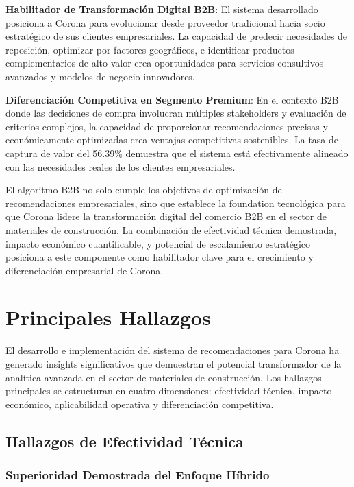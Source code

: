 \documentclass[twocolumn]{article}
\begin{document}
\textbf{Habilitador de Transformación Digital B2B}: El sistema desarrollado posiciona a Corona para evolucionar desde proveedor tradicional hacia socio estratégico de sus clientes empresariales. La capacidad de predecir necesidades de reposición, optimizar por factores geográficos, e identificar productos complementarios de alto valor crea oportunidades para servicios consultivos avanzados y modelos de negocio innovadores.

\textbf{Diferenciación Competitiva en Segmento Premium}: En el contexto B2B donde las decisiones de compra involucran múltiples stakeholders y evaluación de criterios complejos, la capacidad de proporcionar recomendaciones precisas y económicamente optimizadas crea ventajas competitivas sostenibles. La tasa de captura de valor del 56.39\% demuestra que el sistema está efectivamente alineado con las necesidades reales de los clientes empresariales.

El algoritmo B2B no solo cumple los objetivos de optimización de recomendaciones empresariales, sino que establece la foundation tecnológica para que Corona lidere la transformación digital del comercio B2B en el sector de materiales de construcción. La combinación de efectividad técnica demostrada, impacto económico cuantificable, y potencial de escalamiento estratégico posiciona a este componente como habilitador clave para el crecimiento y diferenciación empresarial de Corona.

\section{Principales Hallazgos}

El desarrollo e implementación del sistema de recomendaciones para Corona ha generado insights significativos que demuestran el potencial transformador de la analítica avanzada en el sector de materiales de construcción. Los hallazgos principales se estructuran en cuatro dimensiones: efectividad técnica, impacto económico, aplicabilidad operativa y diferenciación competitiva.

\subsection{Hallazgos de Efectividad Técnica}

\subsubsection{Superioridad Demostrada del Enfoque Híbrido}
\end{document}
